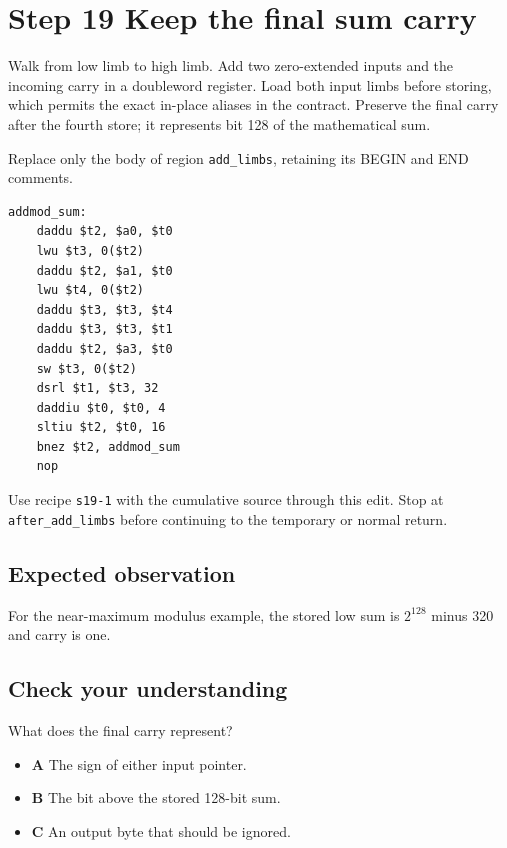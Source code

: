 \section{Step 19 Keep the final sum carry}\label{rsa-s19}

Walk from low limb to high limb. Add two zero-extended inputs and the incoming carry in a doubleword register. Load both input limbs before storing, which permits the exact in-place aliases in the contract. Preserve the final carry after the fourth store; it represents bit 128 of the mathematical sum.

Replace only the body of region \texttt{add\_limbs}, retaining its BEGIN and END comments.

\begin{verbatim}
addmod_sum:
    daddu $t2, $a0, $t0
    lwu $t3, 0($t2)
    daddu $t2, $a1, $t0
    lwu $t4, 0($t2)
    daddu $t3, $t3, $t4
    daddu $t3, $t3, $t1
    daddu $t2, $a3, $t0
    sw $t3, 0($t2)
    dsrl $t1, $t3, 32
    daddiu $t0, $t0, 4
    sltiu $t2, $t0, 16
    bnez $t2, addmod_sum
    nop
\end{verbatim}

Use recipe \texttt{s19-1} with the cumulative source through this edit. Stop at \texttt{after\_add\_limbs} before continuing to the temporary or normal return.

\subsection{Expected observation}
For the near-maximum modulus example, the stored low sum is \(2^{128}\) minus 320 and carry is one.

\subsection{Check your understanding}
What does the final carry represent?

\begin{itemize}
  \item \textbf{A} The sign of either input pointer.
  \item \textbf{B} The bit above the stored 128-bit sum.
  \item \textbf{C} An output byte that should be ignored.
\end{itemize}
